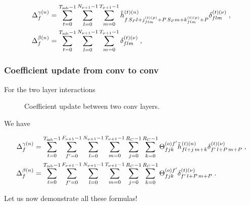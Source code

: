 \begin{align}
\Delta_f^{\gamma(n)}&=
%
\sum_{t=0}^{T_{{\rm mb}}-1}\sum_{l=0}^{N_{\nu+1}-1}\sum_{m=0}^{T_{\nu+1}-1}
%
\tilde{h}_{f\,S_P l+j_{flm}^{(t)(p)}+P\,S_Pm+k_{flm}^{(t)(p)}+P}^{(t)(n)}\delta^{(t)(\nu)}_{flm}\;,\notag\\
%
\Delta_f^{\beta(n)}&=
%
\sum_{t=0}^{T_{{\rm mb}}-1}\sum_{l=0}^{N_{\nu+1}-1}\sum_{m=0}^{T_{\nu+1}-1}\delta^{(t)(\nu)}_{flm}\;,
\end{align}


\subsubsection{Coefficient update from conv to conv}

For the two layer interactions

\begin{figure}[H]
\begin{center}
\caption{Coefficient update between two conv layers.}
\end{center}
\end{figure}

We have


\begin{align}
\Delta_f^{\gamma(n)}&=
%
\sum_{t=0}^{T_{{\rm mb}}-1}\sum_{f'=0}^{F_{\nu+1}-1}\sum_{l=0}^{N_{\nu+1}-1}\sum_{m=0}^{T_{\nu+1}-1}
%
\sum_{j=0}^{R_C-1}\sum_{k=0}^{R_C-1}\Theta^{(o)f'}_{fjk}
%
\tilde{h}^{(t)(n)}_{fl+j\,m+k}\delta^{(t)(\nu)}_{f'\,l+P\,m+P}\;,\notag\\
%
\Delta_f^{\beta(n)}&=
%
\sum_{t=0}^{T_{{\rm mb}}-1}\sum_{f'=0}^{F_{\nu+1}-1}\sum_{l=0}^{N_{\nu+1}-1}\sum_{m=0}^{T_{\nu+1}-1}
%
\sum_{j=0}^{R_C-1}\sum_{k=0}^{R_C-1}\Theta^{(o)f'}_{fjk}\delta^{(t)(\nu)}_{f'\,l+P\,m+P}\;.
\end{align}

Let us now demonstrate all these formulas! 

